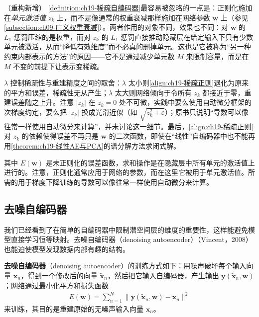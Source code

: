 \documentclass[../../main.tex]{subfiles}
\begin{document}
\begin{remark}（重构新增）
\cref{definition:ch19-稀疏自编码器}最容易被忽略的一点是：正则化施加在\emph{单元激活值} $z_k$ 上，而不是像通常的权重衰减那样施加在网络参数 $\bm{w}$ 上（参见\cref{subsection:ch09-广义权重衰减}）。两者作用的对象不同，效果也不同：对 $\bm{w}$ 的 $L_1$ 惩罚压缩的是权重，而对 $z_k$ 的 $L_1$ 惩罚直接推动隐藏层在给定输入下只有少数单元被激活，从而“降低有效维度”而不必真的删掉单元。这也是它被称为“另一种约束内部表示的方法”的原因——它不是通过减少单元数 $M$ 来限制容量，而是在 $M$ 不变的前提下让表示变稀疏。

$\lambda$ 控制稀疏性与重建精度之间的取舍：$\lambda$ 太小则\eqref{align:ch19-稀疏正则}退化为原来的平方和误差，稀疏性无从产生；$\lambda$ 太大则网络倾向于令所有 $z_k$ 都接近于零，重建误差随之上升。注意 $|z_k|$ 在 $z_k=0$ 处不可微，实践中要么使用自动微分框架的次梯度约定，要么把 $|z_k|$ 换成光滑近似（如 $\sqrt{z_k^{2}+\varepsilon}$）；原书只说明“导数可以像往常一样使用自动微分来计算”，并未讨论这一细节。最后，\eqref{align:ch19-稀疏正则}对 $z_k$ 的依赖使得误差不再只是 $\bm{w}$ 的二次函数，即使在“线性”自编码器中也不能再用\cref{theorem:ch19-线性AE与PCA}的谱分解方法求闭式解。
\end{remark}

其中 $E(\bm{w})$ 是未正则化的误差函数，求和操作是在隐藏层中所有单元的激活值上进行的。注意，正则化通常应用于网络的参数，而在这里它被用于单元激活值。所需的用于梯度下降训练的导数可以像往常一样使用自动微分来计算。

\subsection{去噪自编码器}\label{subsection:ch19-去噪自编码器}

我们已经看到了在简单的自编码器中限制潜空间层的维度的重要性，这样能避免模型直接学习恒等映射。去噪自编码器（denoising autoencoder）（Vincent，2008）也能迫使模型发现数据内部有趣的结构。

\begin{definition}[去噪自编码器]\label{definition:ch19-去噪自编码器}
\textbf{去噪自编码器}（denoising autoencoder）的训练方式如下：用噪声破坏每个输入向量 $\bm{x}_n$，得到一个修改后的向量 $\tilde{\bm{x}}_n$，然后把它输入自编码器，产生输出 $\bm{y}(\tilde{\bm{x}}_n,\bm{w})$；网络通过最小化平方和损失函数
\begin{align}
E(\bm{w})=\sum_{n=1}^{N}\big\|\bm{y}(\tilde{\bm{x}}_n,\bm{w})-\bm{x}_n\big\|^{2}
\label{align:ch19-去噪损失}
\end{align}
来训练，其目的是重建原始的无噪声输入向量 $\bm{x}_n$。
\end{definition}
\end{document}
